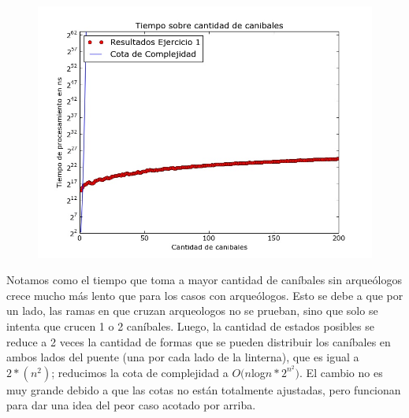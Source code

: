   \begin{figure}[H]
      \begin{center}
        \includegraphics[width=0.7\columnwidth]{imagenes/exp2Ej1.jpeg}
        \caption{}
      \end{center}
  \end{figure}

  Notamos como el tiempo que toma a mayor cantidad de caníbales sin arqueólogos crece mucho más lento que para los casos con arqueólogos. Esto se debe a que por un lado, las ramas en que cruzan arqueologos no se prueban, sino que solo se intenta que crucen 1 o 2 caníbales. Luego, la cantidad de estados posibles se reduce a 2 veces la cantidad de formas que se pueden distribuir los caníbales en ambos lados del puente (una por cada lado de la linterna), que es igual a $2*(n^2)$; reducimos la cota de complejidad a $O(n $log$ n*2^{n^2})$. El cambio no es muy grande debido a que las cotas no están totalmente ajustadas, pero funcionan para dar una idea del peor caso acotado por arriba.
